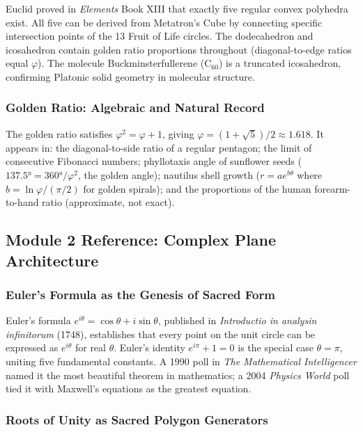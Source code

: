 \documentclass[11pt,letterpaper]{article}
\begin{document}
Euclid proved in \textit{Elements} Book XIII that exactly five regular convex polyhedra exist. All five can be derived from Metatron's Cube by connecting specific intersection points of the 13 Fruit of Life circles. The dodecahedron and icosahedron contain golden ratio proportions throughout (diagonal-to-edge ratios equal $\varphi$). The molecule Buckminsterfullerene (C$_{60}$) is a truncated icosahedron, confirming Platonic solid geometry in molecular structure.

\subsubsection{Golden Ratio: Algebraic and Natural Record}

The golden ratio satisfies $\varphi^2 = \varphi + 1$, giving $\varphi = (1+\sqrt{5})/2 \approx 1.618$. It appears in: the diagonal-to-side ratio of a regular pentagon; the limit of consecutive Fibonacci numbers; phyllotaxis angle of sunflower seeds ($137.5° = 360°/\varphi^2$, the golden angle); nautilus shell growth ($r = ae^{b\theta}$ where $b = \ln\varphi / (\pi/2)$ for golden spirals); and the proportions of the human forearm-to-hand ratio (approximate, not exact).

\subsection{Module 2 Reference: Complex Plane Architecture}

\subsubsection{Euler's Formula as the Genesis of Sacred Form}

Euler's formula $e^{i\theta} = \cos\theta + i\sin\theta$, published in \textit{Introductio in analysin infinitorum} (1748), establishes that every point on the unit circle can be expressed as $e^{i\theta}$ for real $\theta$. Euler's identity $e^{i\pi} + 1 = 0$ is the special case $\theta = \pi$, uniting five fundamental constants. A 1990 poll in \textit{The Mathematical Intelligencer} named it the most beautiful theorem in mathematics; a 2004 \textit{Physics World} poll tied it with Maxwell's equations as the greatest equation.

\subsubsection{Roots of Unity as Sacred Polygon Generators}
\end{document}
